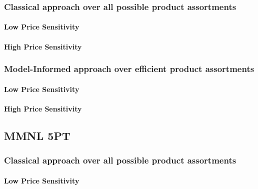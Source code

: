 \subsubsection{Classical approach over all possible product assortments}

\paragraph{Low Price Sensitivity}



\paragraph{High Price Sensitivity}



\subsubsection{Model-Informed approach over efficient product assortments}

\paragraph{Low Price Sensitivity}



\paragraph{High Price Sensitivity}



\subsection{MMNL 5PT}

\subsubsection{Classical approach over all possible product assortments}

\paragraph{Low Price Sensitivity}

